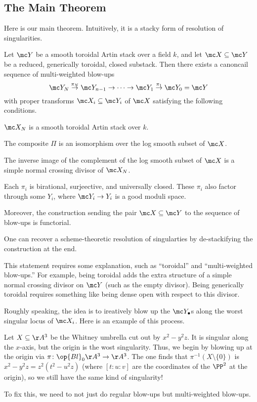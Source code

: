 \documentclass{article}
\begin{document}
\subsection{The Main Theorem}
Here is our main theorem. Intuitively, it is a stacky form of resolution of singularities.
\begin{theorem}
    Let $\mc Y$ be a smooth toroidal Artin stack over a field $k$, and let $\mc X\subseteq\mc Y$ be a reduced, generically toroidal, closed substack. Then there exists a canoncail sequence of multi-weighted blow-ups
    \[\mc Y_N\stackrel{\pi_N}\to\mc Y_{n-1}\to\cdots\to\mc Y_1\stackrel{\pi_1}\to\mc Y_0=\mc Y\]
    with proper transforms $\mc X_i\subseteq\mc Y_i$ of $\mc X$ satisfying the following conditions.
    \begin{listalph}
        \item $\mc X_N$ is a smooth toroidal Artin stack over $k$.
        \item The composite $\Pi$ is an isomorphism over the log smooth subset of $\mc X$.
        \item The inverse image of the complement of the log smooth subset of $\mc X$ is a simple normal crossing divisor of $\mc X_N$.
        \item Each $\pi_i$ is birational, surjeective, and universally closed. These $\pi_i$ also factor through some $Y_i$, where $\mc Y_i\to Y_i$ is a good moduli space.
    \end{listalph}
    Moreover, the construction sending the pair $\mc X\subseteq\mc Y$ to the sequence of blow-ups is functorial.
\end{theorem}
\begin{remark}
    One can recover a scheme-theoretic resolution of singularties by de-stackifying the construction at the end.
\end{remark}
This statement requires some explanation, such as ``toroidal'' and ``multi-weighted blow-ups.'' For example, being toroidal adds the extra structure of a simple normal crossing divisor on $\mc Y$ (such as the empty divisor). Being generically toroidal requires something like being dense open with respect to this divisor.

Roughly speaking, the idea is to ireatively blow up the $\mc Y_\bullet$s along the worst singular locus of $\mc X_i$. Here is an example of this process.
\begin{example}
    Let $X\subseteq\AA^3$ be the Whitney umbrella cut out by $x^2-y^2z$. It is singular along the $x$-axis, but the origin is the wost singularity. Thus, we begin by blowing up at the origin via $\pi\colon\op{Bl}_0\AA^3\to\AA^3$. The one finds that $\pi^{-1}(X\setminus\{0\})$ is $x^2-y^2z=z^2\left(t^2-u^2z\right)$ (where $[t:u:v]$ are the coordinates of the $\PP^2$ at the origin), so we still have the same kind of singularity!
\end{example}
To fix this, we need to not just do regular blow-ups but multi-weighted blow-ups.
\end{document}
